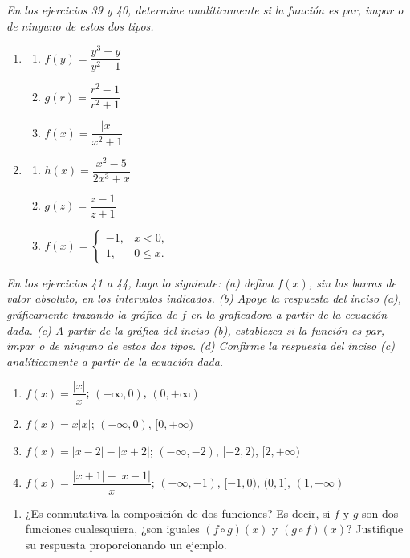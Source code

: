 \documentclass[12pt]{article}
\theoremstyle{remark}
\begin{document}
\textit{En los ejercicios 39 y 40, determine analíticamente si la función es par, impar o de ninguno de estos dos tipos.}

\begin{enumerate}[start=39]
\item \begin{enumerate}[label=(\alph*)]\item $f(y)=\dfrac{y^3-y}{y^2+1}$ \item $g(r)=\dfrac{r^2-1}{r^2+1}$ \item $f(x)=\dfrac{|x|}{x^2+1}$\end{enumerate}
\item \begin{enumerate}[label=(\alph*)]\item $h(x)=\dfrac{x^2-5}{2x^3+x}$ \item $g(z)=\dfrac{z-1}{z+1}$ \item $f(x)=\begin{cases}-1,&x<0,\\1,&0\le x.\end{cases}$\end{enumerate}
\end{enumerate}

\textit{En los ejercicios 41 a 44, haga lo siguiente: (a) defina $f(x)$, sin las barras de valor absoluto, en los intervalos indicados. (b) Apoye la respuesta del inciso (a), gráficamente trazando la gráfica de $f$ en la graficadora a partir de la ecuación dada. (c) A partir de la gráfica del inciso (b), establezca si la función es par, impar o de ninguno de estos dos tipos. (d) Confirme la respuesta del inciso (c) analíticamente a partir de la ecuación dada.}

\begin{enumerate}[start=41]
\item $f(x)=\dfrac{|x|}{x}$; $(-\infty,0)$, $(0,+\infty)$
\item $f(x)=x|x|$; $(-\infty,0)$, $[0,+\infty)$
\item $f(x)=|x-2|-|x+2|$; $(-\infty,-2)$, $[-2,2)$, $[2,+\infty)$
\item $f(x)=\dfrac{|x+1|-|x-1|}{x}$; $(-\infty,-1)$, $[-1,0)$, $(0,1]$, $(1,+\infty)$
\end{enumerate}

\begin{enumerate}[start=45]
\item ¿Es conmutativa la composición de dos funciones? Es decir, si $f$ y $g$ son dos funciones cualesquiera, ¿son iguales $(f\circ g)(x)$ y $(g\circ f)(x)$? Justifique su respuesta proporcionando un ejemplo.
\end{enumerate}
\end{document}
